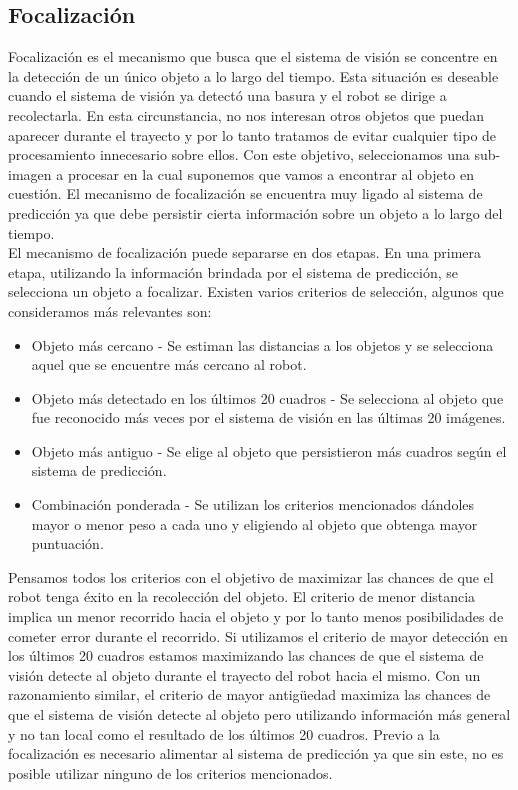 	\subsection{Focalización}
	Focalización es el mecanismo que busca que el sistema de visión se concentre en la detección de un único objeto a lo largo del tiempo. Esta situación es deseable cuando el sistema de visión ya detectó una basura y el robot se dirige a recolectarla. En esta circunstancia, no nos interesan otros objetos que puedan aparecer durante el trayecto y por lo tanto tratamos de evitar cualquier tipo de procesamiento innecesario sobre ellos. Con este objetivo, seleccionamos una sub-imagen a procesar en la cual suponemos que vamos a encontrar al objeto en cuestión. El mecanismo de focalización se encuentra muy ligado al sistema de predicción ya que debe persistir cierta información sobre un objeto a lo largo del tiempo.\\
\indent El mecanismo de focalización puede separarse en dos etapas. En una primera etapa, utilizando la información brindada por el sistema de predicción, se selecciona un objeto a focalizar. Existen varios criterios de selección, algunos que consideramos más relevantes son:
\begin{itemize}
\item{ Objeto más cercano - Se estiman las distancias a los objetos y se selecciona aquel que se encuentre más cercano al robot.}
\item{ Objeto más detectado en los últimos 20 cuadros - Se selecciona al objeto que fue reconocido más veces por el sistema de visión en las últimas 20 imágenes.}
\item{ Objeto más antiguo - Se elige al objeto que persistieron más cuadros según el sistema de predicción.}
\item{ Combinación ponderada - Se utilizan los  criterios mencionados dándoles mayor o menor peso a cada uno y eligiendo al objeto que obtenga mayor puntuación.}
\end{itemize}
Pensamos todos los criterios con el objetivo de maximizar las chances de que el robot tenga éxito en la recolección del objeto. El criterio de menor distancia implica un menor recorrido hacia el objeto y por lo tanto menos posibilidades de cometer error durante el recorrido. Si utilizamos el criterio de mayor detección en los últimos 20 cuadros estamos maximizando las chances de que el sistema de visión detecte al objeto durante el trayecto del robot hacia el mismo. Con un razonamiento similar, el criterio de mayor antigüedad maximiza las chances de que el sistema de visión detecte al objeto pero utilizando información más general y no tan local como el resultado de los últimos 20 cuadros. Previo a la focalización es necesario alimentar al sistema de predicción ya que sin este, no es posible utilizar ninguno de los criterios mencionados.\\ 
